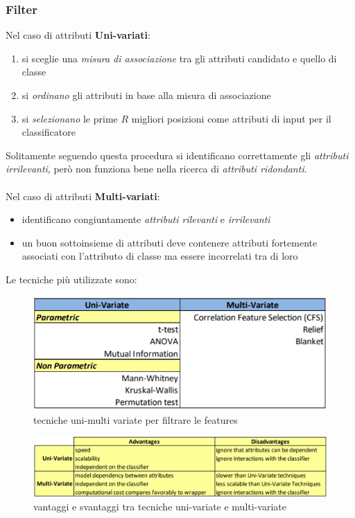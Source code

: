 \subsubsection{Filter} 
Nel caso di attributi \textbf{Uni-variati}: 
\begin{enumerate}
	\item si sceglie una \textit{misura di associazione} tra gli attributi candidato e quello di classe
	\item si \textit{ordinano} gli attributi in base alla misura di associazione
	\item si \textit{selezionano} le prime $R$ migliori posizioni come attributi di input per il classificatore
\end{enumerate}
Solitamente seguendo questa procedura si identificano correttamente gli \textit{attributi irrilevanti}, per\`o non funziona bene nella ricerca di \textit{attributi ridondanti}.\\
\\
Nel caso di attributi \textbf{Multi-variati}:
\begin{itemize}
	\item identificano congiuntamente \textit{attributi rilevanti} e \textit{irrilevanti}
	\item un buon sottoinsieme di attributi deve contenere attributi fortemente associati con l'attributo di classe ma essere incorrelati tra di loro
\end{itemize}
Le tecniche più utilizzate sono:
\begin{figure}[H]
	\centering
	\includegraphics[height=0.35 \linewidth]{classification/pict/feature_tecniques.png}
	\caption{tecniche uni-multi variate per filtrare le features}
\end{figure}
\begin{figure}[H]
	\centering
	\includegraphics[height=0.22 \linewidth]{classification/pict/filter_uni_multi.png}
	\caption{vantaggi e svantaggi tra tecniche uni-variate e multi-variate}
\end{figure}
